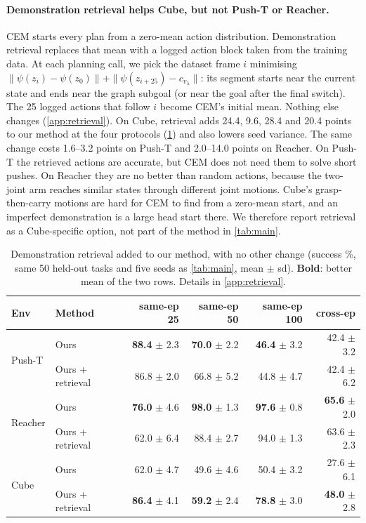 \documentclass{article} %
\newcommand{\z}{z}
\newcommand{\psiT}{\psi}
\begin{document}
\paragraph{Demonstration retrieval helps Cube, but not Push-T or Reacher.} CEM starts every
plan from a zero-mean action distribution. Demonstration retrieval replaces that mean with a
logged action block taken from the training data. At each planning call, we pick the dataset
frame $i$ minimising $\|\psiT(\z_i)-\psiT(\z_0)\|+\|\psiT(\z_{i+25})-c_{v_\lambda}\|$: its
segment starts near the current state and ends near the graph subgoal (or near the goal after
the final switch). The 25 logged actions that follow $i$ become CEM's initial mean. Nothing else
changes (\cref{app:retrieval}). On Cube, retrieval adds 24.4, 9.6, 28.4 and 20.4 points to our
method at the four protocols (\cref{tab:retrieval}) and also lowers seed variance. The same
change costs 1.6--3.2 points on Push-T and 2.0--14.0 points on Reacher. On Push-T the retrieved
actions are accurate, but CEM does not need them to solve short pushes. On Reacher they are
no better than random actions, because the two-joint arm reaches similar states through
different joint motions. Cube's grasp-then-carry motions are hard for CEM to find from a
zero-mean start, and an imperfect demonstration is a large head start there. We therefore
report retrieval as a Cube-specific option, not part of the method in \cref{tab:main}.

\begin{table}[t]
\centering\small
\caption{Demonstration retrieval added to our method, with no other change (success \%, same
50 held-out tasks and five seeds as \cref{tab:main}, mean $\pm$ sd). \textbf{Bold}: better
mean of the two rows. Details in \cref{app:retrieval}.}
\label{tab:retrieval}
\begin{tabular}{llrrrr}
\toprule
Env & Method & same-ep 25 & same-ep 50 & same-ep 100 & cross-ep \\
\midrule
\multirow{2}{*}{Push-T} & Ours & \textbf{88.4} $\pm$ 2.3 & \textbf{70.0} $\pm$ 2.2 & \textbf{46.4} $\pm$ 3.2 & 42.4 $\pm$ 3.2 \\
 & Ours + retrieval & 86.8 $\pm$ 2.0 & 66.8 $\pm$ 5.2 & 44.8 $\pm$ 4.7 & 42.4 $\pm$ 6.2 \\
\midrule
\multirow{2}{*}{Reacher} & Ours & \textbf{76.0} $\pm$ 4.6 & \textbf{98.0} $\pm$ 1.3 & \textbf{97.6} $\pm$ 0.8 & \textbf{65.6} $\pm$ 2.0 \\
 & Ours + retrieval & 62.0 $\pm$ 6.4 & 88.4 $\pm$ 2.7 & 94.0 $\pm$ 1.3 & 63.6 $\pm$ 2.3 \\
\midrule
\multirow{2}{*}{Cube} & Ours & 62.0 $\pm$ 4.7 & 49.6 $\pm$ 4.6 & 50.4 $\pm$ 3.2 & 27.6 $\pm$ 6.1 \\
 & Ours + retrieval & \textbf{86.4} $\pm$ 4.1 & \textbf{59.2} $\pm$ 2.4 & \textbf{78.8} $\pm$ 3.0 & \textbf{48.0} $\pm$ 2.8 \\
\bottomrule
\end{tabular}
\end{table}
\end{document}

